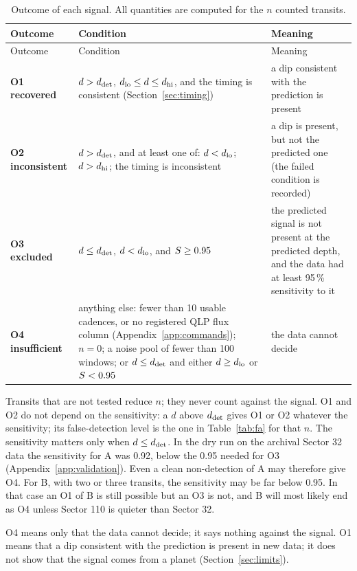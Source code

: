 \begin{longtable}{>{\raggedright\arraybackslash}p{}>{\raggedright\arraybackslash}p{}>{\raggedright\arraybackslash}p{}}
\caption{Outcome of each signal. All quantities are computed for the $n$ counted transits.\label{tab:outcomes}}\\
\toprule
Outcome & Condition & Meaning \\
\midrule
\endfirsthead
\toprule
Outcome & Condition & Meaning \\
\midrule
\endhead
\textbf{O1 recovered} & $d > d_{\rm det}$, $d_{\rm lo} \leq d \leq d_{\rm hi}$, and the timing is consistent (Section~\ref{sec:timing}) &
  a dip consistent with the prediction is present \\
\textbf{O2 inconsistent} & $d > d_{\rm det}$, and at least one of: $d < d_{\rm lo}$; $d > d_{\rm hi}$; the timing is inconsistent & a dip is present, but
  not the predicted one (the failed condition is recorded) \\
\textbf{O3 excluded} & $d \leq d_{\rm det}$, $d < d_{\rm lo}$, and $S \geq 0.95$ & the predicted signal is not present at the
  predicted depth, and the data had at least 95\,\% sensitivity to it \\
\textbf{O4 insufficient} & anything else: fewer than 10 usable cadences, or no registered QLP flux column
  (Appendix~\ref{app:commands}); $n = 0$; a noise pool of fewer than 100 windows; or $d \leq d_{\rm det}$ and either $d \geq d_{\rm lo}$ or
  $S < 0.95$ & the data cannot decide \\
\bottomrule
\end{longtable}

Transits that are not tested reduce $n$; they never count against the signal. O1 and O2 do not depend on the
sensitivity: a $d$ above $d_{\rm det}$ gives O1 or O2 whatever the sensitivity; its false-detection level is the one in
Table~\ref{tab:fa} for that $n$. The sensitivity matters only when $d \leq d_{\rm det}$. In the dry run on the archival
Sector 32 data the sensitivity for A was 0.92, below the 0.95 needed for O3 (Appendix~\ref{app:validation}). Even a
clean non-detection of A may therefore give O4. For B, with two or three transits, the sensitivity may be far below
0.95. In that case an O1 of B is still possible but an O3 is not, and B will most likely end as O4 unless Sector 110 is
quieter than Sector 32.

O4 means only that the data cannot decide; it says nothing against the signal. O1 means that a dip consistent with the prediction is
present in new data; it does not show that the signal comes from a planet (Section~\ref{sec:limits}).

